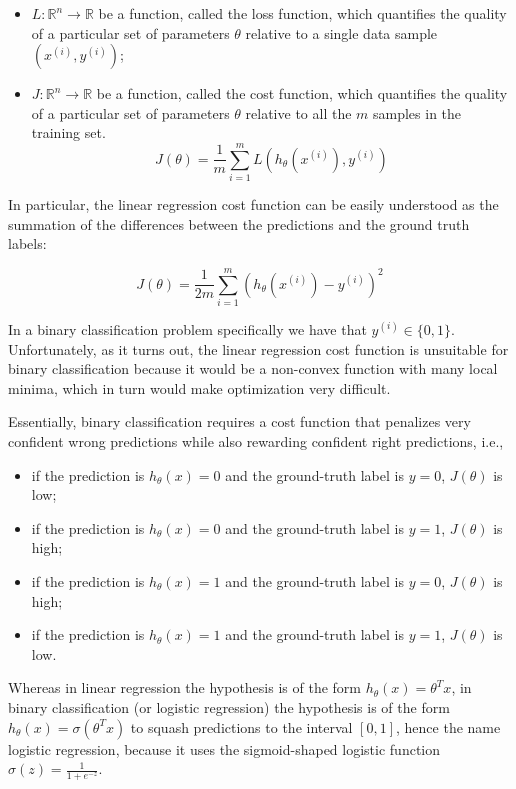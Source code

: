 \begin{itemize}
    \item $L \colon \mathbb{R}^n \to \mathbb{R}$ be a function, called the loss function, which quantifies the quality of a particular set of parameters $\theta$ relative to a single data sample $(x^{(i)}, y^{(i)})$;
    \item $J \colon \mathbb{R}^n \to \mathbb{R}$ be a function, called the cost function, which quantifies the quality of a particular set of parameters $\theta$ relative to all the $m$ samples in the training set. $$J(\theta) = \frac{1}{m} \sum_{i=1}^{m} L(h_{\theta}(x^{(i)}), y^{(i)})$$
\end{itemize}

In particular, the linear regression cost function can be easily understood as the summation of the differences between the predictions and the ground truth labels:

$$
J(\theta) = \frac{1}{2m} \sum_{i=1}^{m} (h_{\theta}(x^{(i)}) - y^{(i)})^2
$$

In a binary classification problem specifically we have that $y^{(i)} \in \{0, 1\}$. Unfortunately, as it turns out, the linear regression cost function is unsuitable for binary classification because it would be a non-convex function with many local minima, which in turn would make optimization very difficult.

Essentially, binary classification requires a cost function that penalizes very confident wrong predictions while also rewarding confident right predictions, i.e.,

\begin{itemize}
    \item if the prediction is $h_{\theta}(x) = 0$ and the ground-truth label is $y = 0$, $J(\theta)$ is low;
    \item if the prediction is $h_{\theta}(x) = 0$ and the ground-truth label is $y = 1$, $J(\theta)$ is high;
    \item if the prediction is $h_{\theta}(x) = 1$ and the ground-truth label is $y = 0$, $J(\theta)$ is high;
    \item if the prediction is $h_{\theta}(x) = 1$ and the ground-truth label is $y = 1$, $J(\theta)$ is low.
\end{itemize}

Whereas in linear regression the hypothesis is of the form $h_{\theta}(x) = \theta^Tx$, in binary classification (or logistic regression) the hypothesis is of the form $h_{\theta}(x) = \sigma(\theta^Tx)$ to squash predictions to the interval $[0, 1]$, hence the name logistic regression, because it uses the sigmoid-shaped logistic function $\sigma(z) = \frac{1}{1 + e^{-z}}$.


